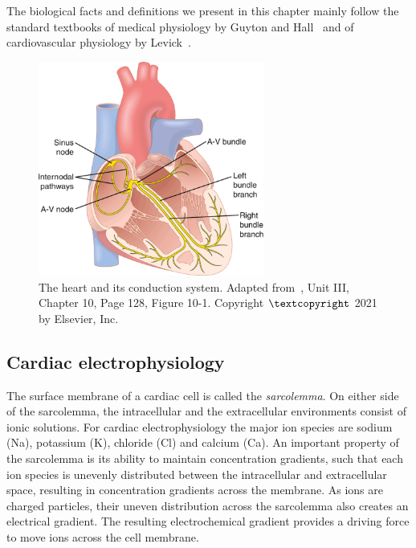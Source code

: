 \vspace{0.2cm}
The biological facts and definitions we present in this chapter mainly follow the standard textbooks of medical physiology by Guyton and Hall~\cite{Guyton:2021} and of cardiovascular physiology by Levick~\cite{Levick:2009}.

\begin{figure}[ht!]
    \myfloatalign
    \includegraphics[width=0.66\textwidth]{figures/chapter01/fig8.png}
    \caption{The heart and its conduction system. Adapted from~\cite{Guyton:2021}, Unit III, Chapter 10, Page 128, Figure 10-1. Copyright $\textcopyright$ 2021 by Elsevier, Inc.}
    \label{fig:heartcondactionsystem}
\end{figure}


%
%
%
\subsection{Cardiac electrophysiology}\label{sec:ch1cardiac_electrophysiology}
The surface membrane of a cardiac cell is called the \textit{sarcolemma}. On either side of the sarcolemma, the intracellular and the extracellular environments consist of ionic solutions. For cardiac electrophysiology the major ion species are sodium (\acs{Na}), potassium (\acs{K}), chloride (\acs{Cl}) and calcium (\acs{Ca}). An important property of the sarcolemma is its ability to maintain concentration gradients, such that each ion species is unevenly distributed between the intracellular and extracellular space, resulting in concentration gradients across the membrane. As ions are charged particles, their uneven distribution across the sarcolemma also creates an electrical gradient. The resulting electrochemical gradient provides a driving force to move ions across the cell membrane.

